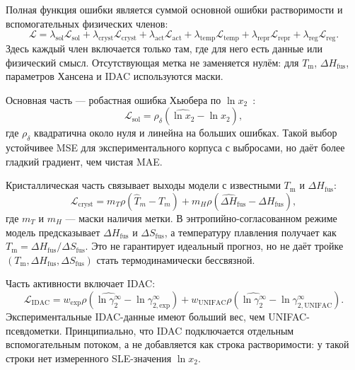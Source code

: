 \documentclass[11pt]{article}
\newcommand{\Tm}{T_{\mathrm m}}
\newcommand{\dHfus}{\Delta H_{\mathrm{fus}}}
\newcommand{\dSfus}{\Delta S_{\mathrm{fus}}}
\theoremstyle{definition}
\begin{document}
Полная функция ошибки является суммой основной ошибки растворимости и вспомогательных физических членов:
\begin{equation*}
    \mathcal L
    = \lambda_{\mathrm{sol}}\mathcal L_{\mathrm{sol}}
    + \lambda_{\mathrm{cryst}}\mathcal L_{\mathrm{cryst}}
    + \lambda_{\mathrm{act}}\mathcal L_{\mathrm{act}}
    + \lambda_{\mathrm{temp}}\mathcal L_{\mathrm{temp}}
    + \lambda_{\mathrm{repr}}\mathcal L_{\mathrm{repr}}
    + \lambda_{\mathrm{reg}}\mathcal L_{\mathrm{reg}}.
\end{equation*}
Здесь каждый член включается только там, где для него есть данные или физический смысл. Отсутствующая метка не заменяется нулём: для $\Tm$, $\dHfus$, параметров Хансена и IDAC используются маски.

Основная часть --- робастная ошибка Хьюбера по $\ln x_2$~\cite{huber1964}:
\begin{equation*}
    \mathcal L_{\mathrm{sol}}
    = \rho_\delta\!\left(\widehat{\ln x_2}-\ln x_2\right),
\end{equation*}
где $\rho_\delta$ квадратична около нуля и линейна на больших ошибках. Такой выбор устойчивее MSE для экспериментального корпуса с выбросами, но даёт более гладкий градиент, чем чистая MAE.

Кристаллическая часть связывает выходы модели с известными $\Tm$ и $\dHfus$:
\begin{equation*}
    \mathcal L_{\mathrm{cryst}}
    = m_T\rho(\widehat T_m-T_m)
    + m_H\rho(\widehat{\Delta H}_{\mathrm{fus}}-\Delta H_{\mathrm{fus}}),
\end{equation*}
где $m_T$ и $m_H$ --- маски наличия метки. В энтропийно-согласованном режиме модель предсказывает $\dHfus$ и $\dSfus$, а температуру плавления получает как $\Tm=\dHfus/\dSfus$. Это не гарантирует идеальный прогноз, но не даёт тройке $(\Tm,\dHfus,\dSfus)$ стать термодинамически бессвязной.

Часть активности включает IDAC:
\begin{equation*}
    \mathcal L_{\mathrm{IDAC}}
    = w_{\mathrm{exp}}\rho\!\left(\widehat{\ln\gamma_2^\infty}-\ln\gamma_{2,\mathrm{exp}}^\infty\right)
    + w_{\mathrm{UNIFAC}}\rho\!\left(\widehat{\ln\gamma_2^\infty}-\ln\gamma_{2,\mathrm{UNIFAC}}^\infty\right).
\end{equation*}
Экспериментальные IDAC-данные имеют больший вес, чем UNIFAC-псевдометки. Принципиально, что IDAC подключается отдельным вспомогательным потоком, а не добавляется как строка растворимости: у такой строки нет измеренного SLE-значения $\ln x_2$.
\end{document}
